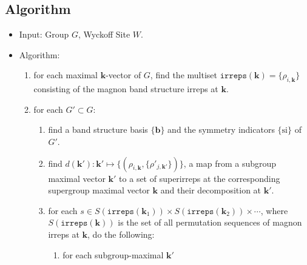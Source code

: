 \documentclass[12pt, a4paper]{article}
\begin{document}
\subsection{Algorithm}
\begin{itemize}
  \item Input: Group $G$, Wyckoff Site $W$.
  \item Algorithm:
    \begin{enumerate}
      \item for each maximal $\bm{k}$-vector of $G$, find the multiset $\mathtt{irreps}({\bm{k}})=\{\rho_{i,\bm{k}}\}$ consisting of the magnon band structure irreps at $\bm{k}$.
      \item for each $G'\subset G$:
        \begin{enumerate}
          \item find a band structure basis $\{\bm{b}\}$ and the symmetry indicators $\{\mathrm{si}\}$ of $G'$.
          \item find $d(\bm{k}'):\bm{k}'\mapsto{\{(\rho_{i,\bm{k}},{\{\rho'_{j,\bm{k}'}\}})\}}$, a map from a subgroup maximal vector $\bm{k}'$ to a set of superirreps at the corresponding supergroup maximal vector $\bm{k}$ and their decomposition at $\bm{k}'$.
          \item for each $s\in S(\mathtt{irreps}(\bm{k}_{1}))\times S(\mathtt{irreps}(\bm{k}_{2}))\times\cdots$, where $S(\mathtt{irreps}(\bm{k}))$ is the set of all permutation sequences of magnon irreps at $\bm{k}$, do the following:
            \begin{enumerate}
              \item for each subgroup-maximal $\bm{k}'$
            \end{enumerate}
        \end{enumerate}
    \end{enumerate}
\end{itemize}
\end{document}
